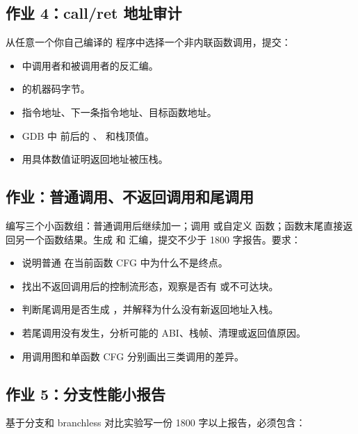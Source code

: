 \begin{exercisebox}
\subsection*{作业 4：call/ret 地址审计}

从任意一个你自己编译的  程序中选择一个非内联函数调用，提交：

\begin{itemize}
  \item {} 中调用者和被调用者的反汇编。
  \item {} 的机器码字节。
  \item {} 指令地址、下一条指令地址、目标函数地址。
  \item GDB 中  前后的 、 和栈顶值。
  \item 用具体数值证明返回地址被压栈。
\end{itemize}

\subsection*{作业：普通调用、不返回调用和尾调用}

编写三个小函数组：普通调用后继续加一；调用  或自定义 \code{[[noreturn]]} 函数；函数末尾直接返回另一个函数结果。生成  和  汇编，提交不少于 1800 字报告。要求：

\begin{itemize}
  \item 说明普通  在当前函数 CFG 中为什么不是终点。
  \item 找出不返回调用后的控制流形态，观察是否有  或不可达块。
  \item 判断尾调用是否生成 ，并解释为什么没有新返回地址入栈。
  \item 若尾调用没有发生，分析可能的 ABI、栈帧、清理或返回值原因。
  \item 用调用图和单函数 CFG 分别画出三类调用的差异。
\end{itemize}

\subsection*{作业 5：分支性能小报告}

基于分支和 branchless 对比实验写一份 1800 字以上报告，必须包含：


\end{exercisebox}
